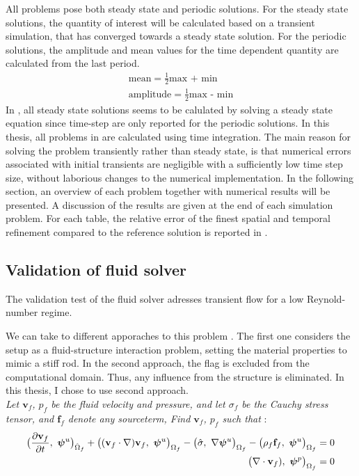 \newpage
All problems pose both steady state and periodic solutions. For the steady state solutions, the quantity of interest will be calculated based on a transient simulation, that has converged towards a steady state solution. For the periodic solutions, the amplitude and mean values for the time dependent quantity are calculated from the last period.
\begin{align}
\text{mean} = \frac{1}{2} \text{max + min} \\
\text{amplitude} = \frac{1}{2} \text{max - min}
\label{icond}
\end{align}
 In \cite{Hron2006}, all steady state solutions seems to be calulated by solving a steady state equation since time-step are only reported for the periodic solutions. In this thesis, all problems in \cite{Hron2006} are calculated using time integration. The main reason for solving the problem transiently rather than steady state, is that numerical errors associated with initial transients are negligible with a sufficiently low time step size, without laborious changes to the numerical implementation. In the following section, an overview of each problem together with numerical results will be presented. A discussion of the results are given at the end of each simulation problem. For each table, the relative error of the finest spatial and temporal refinement compared to the reference solution is reported in \cite{Hron2006}.

\subsection{Validation of fluid solver}
The validation test of the fluid solver adresses transient flow for a low Reynold-number regime. 

We can take to different apporaches to this problem \cite{Hron2006}. The first one considers the setup as a fluid-structure interaction problem, setting the material properties to mimic a stiff rod. In the second approach, the flag is excluded from the computational domain. Thus, any influence from the structure is eliminated. In this thesis, I chose to use second approach.  \\

\textit{Let $\mathbf{v}_f$, ${p}_f$ be the fluid velocity and pressure, and let  $\sigma_f$ be the Cauchy stress tensor, and $\mathbf{f}_f$ denote any sourceterm,  Find $\mathbf{v}_f$, ${p}_f$ such that }:
\begin{align*}
 \big( \frac{\partial \mathbf{v}_f}{\partial t}, \ \bm{\psi}^u \big)_{\hat{\Omega}_f} +
\big((\mathbf{v}_f \cdot \nabla) \mathbf{v}_f, \ {\bm{\psi}^u} \big)_{\Omega_f}
- \big(\hat{\sigma}, \ {\nabla\bm{\psi}^u} \big)_{\Omega_f} -
\big(\rho_f  \mathbf{f}_f, \ {{\bm{\psi}^u}} \big)_{\Omega_f} = 0 \\
\big(\nabla \cdot \mathbf{v}_f), \ {\bm{\psi}^p} \big)_{\Omega_f} = 0 
\end{align*} 



